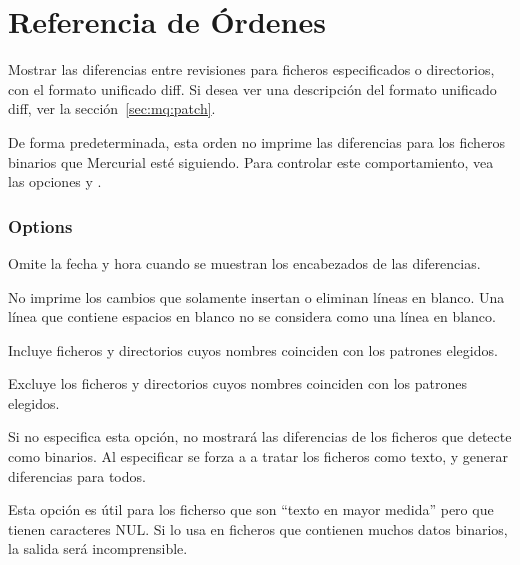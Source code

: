 \chapter{Referencia de Órdenes}
\label{cmdref}



Mostrar las diferencias entre revisiones para ficheros especificados o
directorios, con el formato unificado diff.  Si desea ver una
descripción del formato unificado diff, ver la sección~\ref{sec:mq:patch}.

De forma predeterminada, esta orden no imprime las diferencias para
los ficheros binarios que Mercurial esté siguiendo.  Para controlar
este comportamiento, vea las opciones  y
.

\subsection{Options}


Omite la fecha y hora cuando se muestran los encabezados de las
diferencias.


No imprime los cambios que solamente insertan o eliminan líneas en
blanco.  Una línea que contiene espacios en blanco no se considera
como una línea en blanco.


Incluye ficheros y directorios cuyos nombres coinciden con los
patrones elegidos.


Excluye los ficheros y directorios cuyos nombres coinciden con los
patrones elegidos.


Si no especifica esta opción,  no mostrará las diferencias
de los ficheros que detecte como binarios.  Al especificar 
se forza a  a tratar los ficheros como texto, y generar
diferencias para todos.

Esta opción es útil para los ficherso que son ``texto en mayor
medida'' pero que tienen caracteres NUL.  Si lo usa en ficheros que
contienen muchos datos binarios, la salida será incomprensible.

